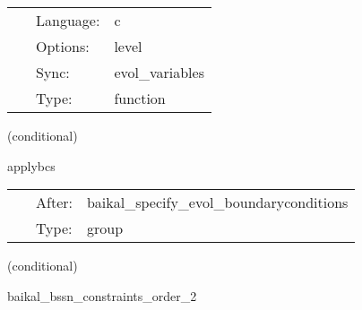 \hspace{5mm}

 \begin{tabular*}{160mm}{cll} 
~ & Language:  & c \\ 
~ & Options:  & level \\ 
~ & Sync:  & evol\_variables \\ 
~ & Type:  & function \\ 
\end{tabular*} 


\vspace{5mm}

   (conditional) 

\hspace{5mm} applybcs 

\hspace{5mm}{\it apply registered boundary conditions } 


\hspace{5mm}

 \begin{tabular*}{160mm}{cll} 
~ & After:  & baikal\_specify\_evol\_boundaryconditions \\ 
~ & Type:  & group \\ 
\end{tabular*} 


\vspace{5mm}

   (conditional) 

\hspace{5mm} baikal\_bssn\_constraints\_order\_2 

\hspace{5mm}{\it compute bssn (hamiltonian and momentum) constraints, at finite-differencing order 2 } 


\hspace{5mm}


